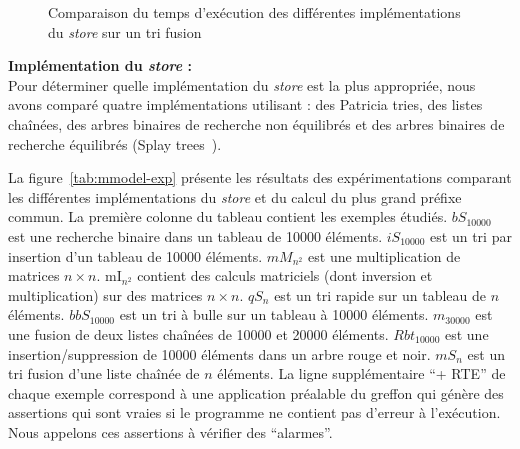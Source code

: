 \begin{figure}[h!]
  \vspace{-.8cm}
  \caption{Comparaison du temps d'exécution des différentes implémentations du
    {\em store} sur un tri fusion
    \label{fig:mmodel-exp}}
\end{figure}




\textbf{Implémentation du {\em store} :}\\
Pour déterminer quelle implémentation du {\em store} est la plus appropriée,
nous avons comparé quatre implémentations utilisant : des Patricia tries, des
listes chaînées, des arbres binaires de recherche non équilibrés et des arbres
binaires de recherche équilibrés (Splay trees~\cite{Sleator/85}).

La figure~\ref{tab:mmodel-exp} présente les résultats des expérimentations
comparant les différentes implémentations du {\em store} et du calcul du plus
grand préfixe commun.
La première colonne du tableau contient les exemples étudiés.
$bS_{10000}$ est une recherche binaire dans un tableau de 10000 éléments.
$iS_{10000}$ est un tri par insertion d'un tableau de 10000 éléments.
$mM_{n^2}$ est une multiplication de matrices $n \times n$. mI$_{n^2}$ contient
des calculs matriciels (dont inversion et multiplication) sur des  matrices
$n \times n$.
$qS_n$ est un tri rapide sur un tableau de $n$ éléments.
$bbS_{10000}$ est un tri à bulle sur un tableau à 10000 éléments.
$m_{30000}$ est une fusion de deux listes chaînées de 10000 et 20000 éléments.
$Rbt_{10000}$ est une insertion/suppression de 10000 éléments dans un arbre rouge
et noir.
$mS_n$ est un tri fusion d'une liste chaînée de $n$ éléments.
La ligne supplémentaire ``+ RTE'' de chaque exemple correspond à une application
préalable du greffon \rte qui génère des assertions qui sont vraies si le
programme ne contient pas d'erreur à l'exécution.
Nous appelons ces assertions à vérifier des ``alarmes''.


